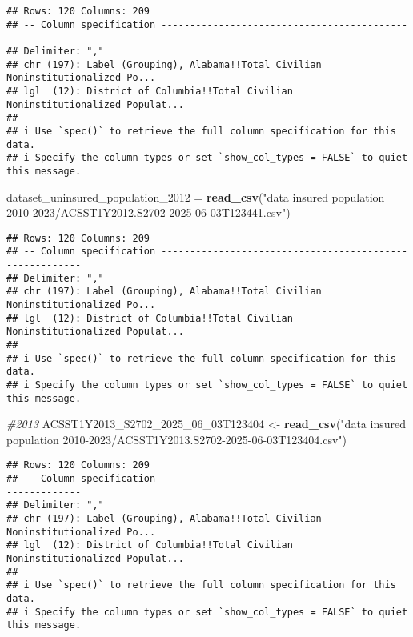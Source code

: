 \documentclass[
]{article}
\newenvironment{Shaded}{\begin{snugshade}}{\end{snugshade}}
\newcommand{\CommentTok}[1]{\textcolor[rgb]{0.56,0.35,0.01}{\textit{#1}}}
\newcommand{\FunctionTok}[1]{\textcolor[rgb]{0.13,0.29,0.53}{\textbf{#1}}}
\newcommand{\NormalTok}[1]{#1}
\newcommand{\OtherTok}[1]{\textcolor[rgb]{0.56,0.35,0.01}{#1}}
\newcommand{\StringTok}[1]{\textcolor[rgb]{0.31,0.60,0.02}{#1}}
\begin{document}
\begin{verbatim}
## Rows: 120 Columns: 209
## -- Column specification --------------------------------------------------------
## Delimiter: ","
## chr (197): Label (Grouping), Alabama!!Total Civilian Noninstitutionalized Po...
## lgl  (12): District of Columbia!!Total Civilian Noninstitutionalized Populat...
## 
## i Use `spec()` to retrieve the full column specification for this data.
## i Specify the column types or set `show_col_types = FALSE` to quiet this message.
\end{verbatim}

\begin{Shaded}
\begin{Highlighting}[]
\NormalTok{dataset\_uninsured\_population\_2012 }\OtherTok{=} \FunctionTok{read\_csv}\NormalTok{(}\StringTok{"data insured population 2010{-}2023/ACSST1Y2012.S2702{-}2025{-}06{-}03T123441.csv"}\NormalTok{)}
\end{Highlighting}
\end{Shaded}

\begin{verbatim}
## Rows: 120 Columns: 209
## -- Column specification --------------------------------------------------------
## Delimiter: ","
## chr (197): Label (Grouping), Alabama!!Total Civilian Noninstitutionalized Po...
## lgl  (12): District of Columbia!!Total Civilian Noninstitutionalized Populat...
## 
## i Use `spec()` to retrieve the full column specification for this data.
## i Specify the column types or set `show_col_types = FALSE` to quiet this message.
\end{verbatim}

\begin{Shaded}
\begin{Highlighting}[]
\CommentTok{\#2013}
\NormalTok{ACSST1Y2013\_S2702\_2025\_06\_03T123404 }\OtherTok{\textless{}{-}} \FunctionTok{read\_csv}\NormalTok{(}\StringTok{"data insured population 2010{-}2023/ACSST1Y2013.S2702{-}2025{-}06{-}03T123404.csv"}\NormalTok{)}
\end{Highlighting}
\end{Shaded}

\begin{verbatim}
## Rows: 120 Columns: 209
## -- Column specification --------------------------------------------------------
## Delimiter: ","
## chr (197): Label (Grouping), Alabama!!Total Civilian Noninstitutionalized Po...
## lgl  (12): District of Columbia!!Total Civilian Noninstitutionalized Populat...
## 
## i Use `spec()` to retrieve the full column specification for this data.
## i Specify the column types or set `show_col_types = FALSE` to quiet this message.
\end{verbatim}
\end{document}
